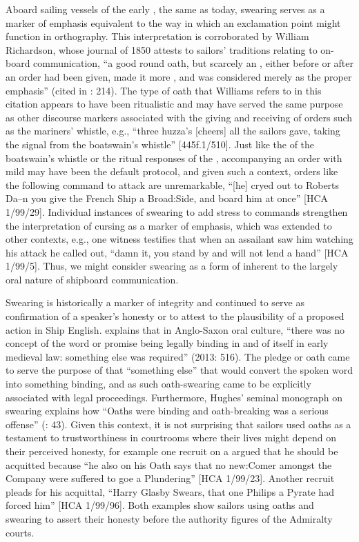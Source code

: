 Aboard sailing vessels of the early , the same as today, swearing serves as a marker of emphasis equivalent to the way in which an exclamation point might function in orthography. This interpretation is corroborated by William Richardson, whose journal of 1850 attests to sailors’ traditions relating to on-board communication, “a good round oath, but scarcely an , either before or after an order had been given, made it more , and was considered merely as the proper emphasis” (cited in \citealt{AdkinsAdkins2008}: 214). The type of oath that Williams refers to in this citation appears to have been ritualistic and may have served the same purpose as other discourse markers associated with the giving and receiving of orders such as the mariners’ whistle, e.g., “three huzza’s [cheers] all the sailors gave, taking the signal from the boatswain’s whistle” [445f.1/510]. Just like the  of the boatswain’s whistle or the ritual responses of the , accompanying an order with mild  may have been the default protocol, and given such a context, orders like the following command to attack are unremarkable, “[he] cryed out to Roberts Da--n you give the French Ship a Broad:Side, and board him at once” [HCA 1/99/29]. Individual instances of swearing to add  stress to commands strengthen the interpretation of cursing as a marker of emphasis, which was extended to other contexts, e.g., one witness testifies that when an assailant saw him watching his attack he called out, “damn it, you stand by and will not lend a hand” [HCA 1/99/5]. Thus, we might consider swearing as a form of   inherent to the largely oral nature of shipboard communication. 

Swearing is historically a marker of integrity and continued to serve as confirmation of a speaker’s honesty or to attest to the plausibility of a proposed action in Ship English. \citeauthor{Ammon2013} explains that in Anglo-Saxon oral culture, “there was no concept of the word or promise being legally binding in and of itself in early medieval law: something else was required” (2013: 516). The pledge or oath came to serve the purpose of that “something else” that would convert the spoken word into something binding, and as such oath-swearing came to be explicitly associated with legal proceedings. Furthermore, Hughes’ seminal monograph on swearing explains how “Oaths were binding and oath-breaking was a serious offense” (\citealt{Hughes1991}: 43). Given this context, it is not surprising that sailors used oaths as a testament to trustworthiness in courtrooms where their lives might depend on their perceived honesty, for example one recruit on a  argued that he should be acquitted because “he also on his Oath says that no new:Comer amongst the Company were suffered to goe a Plundering” [HCA 1/99/23]. Another recruit pleads for his acquittal, “Harry Glasby Swears, that one Philips a Pyrate had forced him” [HCA 1/99/96]. Both examples show sailors using oaths and swearing to assert their honesty before the authority figures of the Admiralty courts. 


